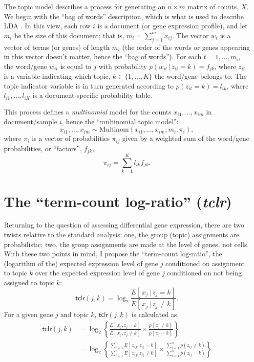 \documentclass[final]{siamart171218}
\begin{document}
The topic model describes a process for generating an $n \times m$
matrix of counts, $X$. We begin with the ``bag of words'' description,
which is what is used to describe LDA \cite{blei-2003}. In this view,
each row $i$ is a document (or gene expression profile), and let $m_i$
be the size of this document; that is, $m_i = \sum_{j=1}^m
x_{ij}$. The vector $w_i$ is a vector of terms (or genes) of length
$m_i$ (the order of the words or genes appearing in this vector
doesn't matter, hence the ``bag of words''). For each $t = 1, \ldots,
m_{i}$, the word/gene $w_{it}$ is equal to $j$ with probability
$p(w_{it} \,|\, z_{it} = k) = f_{jk}$, where $z_{it}$ is a variable
indicating which topic, $k \in \{1, \ldots, K\}$ the word/gene belongs
to. The topic indicator variable is in turn generated according to
$p(z_{it} = k) = l_{ik}$, where $l_{i1}, \ldots, l_{iK}$ is a
document-specific probability table.

This process defines a {\em multinomial} model for the 
counts $x_{i1}, \ldots, x_{im}$ in document/sample $i$, hence the
``multinomial topic model'':
\begin{equation}
x_{i1}, \ldots, x_{im} \sim
\mathrm{Multinom}(x_{i1}, \ldots, x_{im}; m_i, \pi_i),
\end{equation}
where $\pi_i$ is a vector of probabilities $\pi_{ij}$ given by a
weighted sum of the word/gene probabilities, or ``factors'', $f_{jk}$,
\begin{equation}
\pi_{ij} = \sum_{k=1}^K l_{ik} f_{jk}.
\end{equation}

\section{The ``term-count log-ratio'' ({\em tclr})}

Returning to the question of assessing differential gene expression,
there are two twists relative to the standard analysis: one, the group
(topic) assignments are probabilistic; two, the group assignments are
made at the level of genes, not cells. With these two points in mind,
I propose the ``term-count log-ratio'', the (logarithm of the)
expected expression level of gene $j$ conditioned on assignment to
topic $k$ over the expected expression level of gene $j$ conditioned
on not being assigned to topic $k$:
\begin{equation}
\mathsf{tclr}(j,k) =
\log_2 \frac{E[\,x_j \,|\, z_j = k\,]}{E[\,x_j \,|\, z_j \neq k\,]}.
\end{equation}
For a given gene $j$ and topic $k$, $\mathsf{tclr}(j,k)$ is calculated
as
\begin{align}
\mathsf{tclr}(j,k) &=
\log_2 \left\{ \frac{E[\, x_j, z_j = k \,]}{E[\, x_j, z_j \neq k\,]} \times
\frac{p(z_j \neq k)}{p(z_j = k)} \right\} \\
&= \log_2 \left\{ \frac{\sum_{i=1}^n E[\, x_{ij}, z_{ij} = k \,]}
                       {\sum_{i=1}^n E[\, x_{ij}, z_{ij} \neq k\,]} \times
\frac{\sum_{i=1}^n p(z_{ij} \neq k)}{\sum_{i=1}^n p(z_{ij} = k)} \right\} \\
\end{align}



\end{document}
